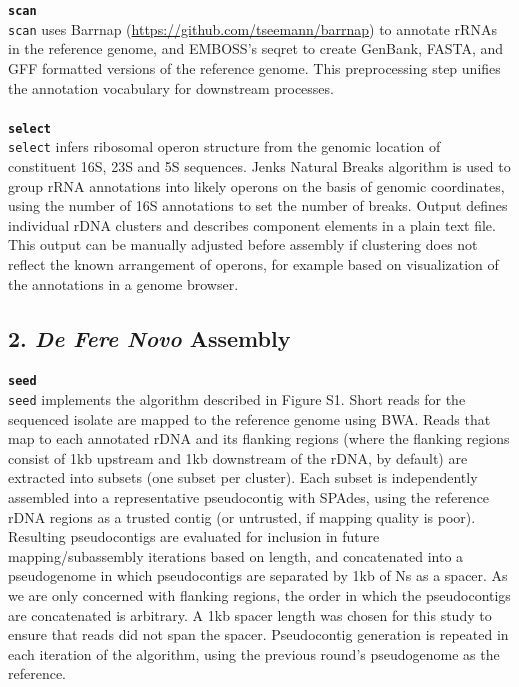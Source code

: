\documentclass[a4,center,fleqn]{NAR}
\begin{document}
\textbf{\texttt{scan}}\\
\texttt{scan} uses Barrnap (\url{https://github.com/tseemann/barrnap}) to annotate rRNAs in the reference genome, and EMBOSS's seqret\cite{Rice2000a} to create GenBank, FASTA, and GFF formatted versions of the reference genome. This preprocessing step unifies the annotation vocabulary for downstream processes.\\
\\
\textbf{\texttt{select}}\\
\texttt{select} infers ribosomal operon structure from the genomic location of constituent 16S, 23S and 5S sequences. Jenks Natural Breaks algorithm is used to group rRNA annotations into likely operons on the basis of genomic coordinates, using the number of 16S annotations to set the number of breaks. Output defines individual rDNA clusters and describes component elements in a plain text file. This output can be manually adjusted before assembly if clustering does not reflect the known arrangement of operons, for example based on visualization of the annotations in a genome browser.

\subsection*{2. \textit{De Fere Novo} Assembly}

\textbf{\texttt{seed}}\\
\texttt{seed} implements the algorithm described in Figure S1. Short reads for the sequenced isolate are mapped to the reference genome using BWA\cite{Li2009}. Reads that map to each annotated rDNA and its flanking regions (where the flanking regions consist of 1kb upstream and 1kb downstream of the rDNA, by default) are extracted into subsets (one subset per cluster). Each subset is independently assembled into a representative pseudocontig with SPAdes\cite{Bankevich2012}, using the reference rDNA regions as a trusted contig (or untrusted, if mapping quality is poor). Resulting pseudocontigs are evaluated for inclusion in future mapping/subassembly iterations based on length, and concatenated into a pseudogenome in which pseudocontigs are separated by 1kb of Ns as a spacer. As we are only concerned with flanking regions, the order in which the pseudocontigs are concatenated is arbitrary. A 1kb spacer length was chosen for this study to ensure that reads did not span the spacer. Pseudocontig generation is repeated in each iteration of the algorithm, using the previous round's pseudogenome as the reference.
\end{document}
